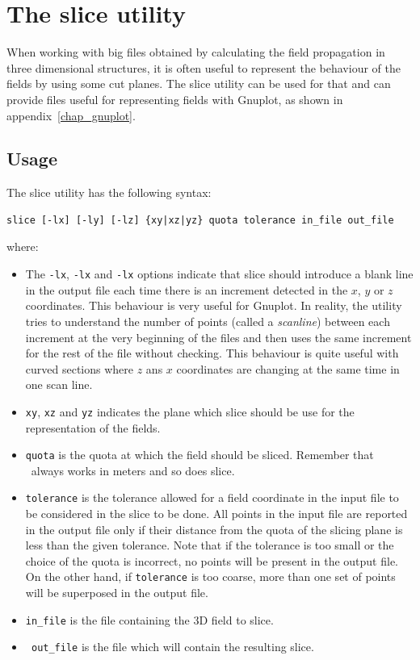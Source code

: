 \chapter{The \textsf{slice} utility}

\textsf{When working with big files obtained by calculating the field propagation in three dimensional structures, it is often useful to represent the behaviour of the fields by using some cut planes. The slice utility can be used for that and can provide files useful for representing fields with Gnuplot, as shown in appendix~\ref{chap_gnuplot}.}

\section{Usage}
The \textsf{slice} utility has the following syntax:
\begin{lstlisting}
slice [-lx] [-ly] [-lz] {xy|xz|yz} quota tolerance in_file out_file
\end{lstlisting}
where:
\begin{itemize}
\item The \lstinline!-lx!, \lstinline!-lx! and \lstinline!-lx! options indicate that \textsf{slice} should introduce a blank line in the output file each time there is an increment detected in the $x$, $y$ or $z$ coordinates. This behaviour is very useful for Gnuplot. In reality, the utility tries to understand the number of points (called a \textit{scanline}) between each increment at the very beginning of the files and then uses the same increment for the rest of the file without checking. This behaviour is quite useful with curved sections where $z$ ans $x$ coordinates are changing at the same time in one scan line.

\item \lstinline!xy!, \lstinline!xz! and \lstinline!yz! indicates the plane which \textsf{slice} should be use for the representation of the fields.

\item \lstinline!quota! is the quota at which the field should be sliced. Remember that \afmm\ always works in meters and so does \textsf{slice}.

\item \lstinline!tolerance! is the tolerance allowed for a field coordinate in the input file to be considered in the slice to be done. All points in the input file are reported in the output file only if their distance from the quota of the slicing plane is less than the given tolerance. Note that if the tolerance is too small or the choice of the quota is incorrect, no points will be present in the output file. On the other hand, if \lstinline!tolerance! is too coarse, more than one set of points will be superposed in the output file.

\item \lstinline!in_file! is the file containing the 3D field to slice.

\item \lstinline! out_file! is the file which will contain the resulting slice.
\end{itemize}


